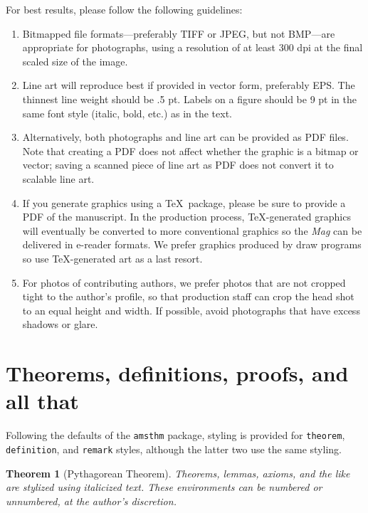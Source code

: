 \documentclass{book}
\theoremstyle{theorem}
\newtheorem{theorem}{Theorem}
\theoremstyle{definition}
\begin{document}
    For best results, please follow the following guidelines:
    \begin{enumerate}
        \item Bitmapped file formats---preferably TIFF or JPEG, but not BMP---are appropriate for photographs, using a resolution of at least 300 dpi at the final scaled size of the image.
        \item Line art will reproduce best if provided in vector form, preferably EPS. The thinnest line weight should be .5 pt.  Labels on a figure should be 9 pt in the same font style (italic, bold, etc.) as in the text.
        \item Alternatively, both photographs and line art can be provided as PDF files.  Note that creating a PDF does not affect whether the graphic is a bitmap or vector; saving a scanned piece of line art as PDF does not convert it to scalable line art.
        \item If you generate graphics using a \TeX\ package, please be sure to provide a PDF of the manuscript.  In the production process, \TeX-generated graphics will eventually be converted to more conventional graphics so the \textit{Mag} can be delivered in e-reader formats.  We prefer graphics produced by draw programs so use \TeX-generated art as a last resort.
        \item For photos of contributing authors, we prefer photos that are not cropped tight to the author's profile, so that production staff can crop the head shot to an equal height and width.  If possible, avoid photographs that have excess shadows or glare.
    \end{enumerate}



    \section{Theorems, definitions, proofs, and all that}

    Following the defaults of the \texttt{amsthm} package, styling is provided for \texttt{theorem}, \texttt{definition}, and \texttt{remark} styles, although the latter two use the same styling.


    \begin{theorem}[Pythagorean Theorem]
        Theorems, lemmas, axioms, and the like are stylized using italicized text. These environments can be numbered or unnumbered, at the author's discretion.
    \end{theorem}
\end{document}
